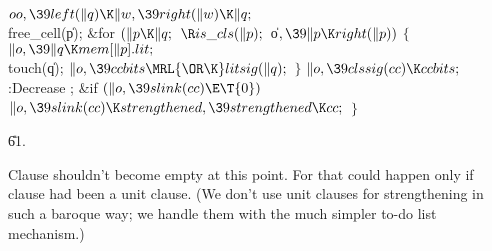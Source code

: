 ${}\\{oo},\39\\{left}(\|q)\K\|w,\39\\{right}(\|w)\K\|q;{}$\6
\\{free\_cell}(\|p);\6
\&{for} ${}(\|p\K\|q;{}$ ${}\R\\{is\_cls}(\|p);{}$ \|o${},\39\|p\K\\{right}(%
\|p)){}$\5
${}\{{}$\1\6
${}\|o,\39\|q\K\\{mem}[\|p].\\{lit};{}$\6
\\{touch}(\|q);\6
${}\|o,\39\\{ccbits}\MRL{{\OR}{\K}}\\{litsig}(\|q);{}$\6
\4${}\}{}$\2\6
${}\|o,\39\\{clssig}(\\{cc})\K\\{ccbits};{}$\6
:Decrease \X;\6
\&{if} ${}(\|o,\39\\{slink}(\\{cc})\E\T{0}){}$\1\5
${}\|o,\39\\{slink}(\\{cc})\K\\{strengthened},\39\\{strengthened}\K\\{cc};{}$\2%
\6
\4${}\}{}$\2\par
\U61.\fi

Clause  shouldn't become empty at this point. For that could
happen
only if clause  had been a unit clause. (We don't use unit clauses
for strengthening in such a baroque way; we handle them with
the much simpler to-do list mechanism.)

